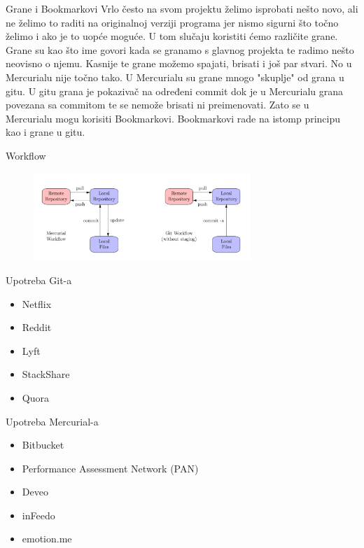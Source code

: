 \documentclass{beamer}
\begin{document}
\begin{frame}{Grane i Bookmarkovi}
Vrlo često na svom projektu želimo isprobati nešto novo, ali ne želimo to raditi na originalnoj verziji programa jer nismo sigurni što točno želimo i ako je to uopće moguće. U tom slučaju koristiti ćemo različite grane. Grane su kao što ime govori kada se granamo s glavnog projekta te radimo nešto neovisno o njemu. Kasnije te grane možemo spajati, brisati i još par stvari. No u Mercurialu nije točno tako. U Mercurialu su grane mnogo "skuplje" od grana u gitu. U gitu grana je pokazivač na određeni commit dok je u Mercurialu grana povezana sa commitom te se nemože brisati ni preimenovati. Zato se u Mercurialu mogu korisiti Bookmarkovi. Bookmarkovi rade na istomp principu kao i grane u gitu.
\end{frame}

\begin{frame}{Workflow}
\begin{figure}
    \centering
    \includegraphics[width = 310px]{workflows.png}
    \label{fig:my_label}
\end{figure}
\end{frame}

\begin{frame}{Upotreba Git-a}
\begin{itemize}
    \item Netflix
    \item Reddit 
    \item Lyft
    \item StackShare
    \item Quora
\end{itemize}
\end{frame}

\begin{frame}{Upotreba Mercurial-a}
\begin{itemize}
    \item Bitbucket
    \item Performance Assessment Network (PAN)
    \item Deveo
    \item inFeedo
    \item emotion.me
\end{itemize}
\end{frame}
\end{document}
